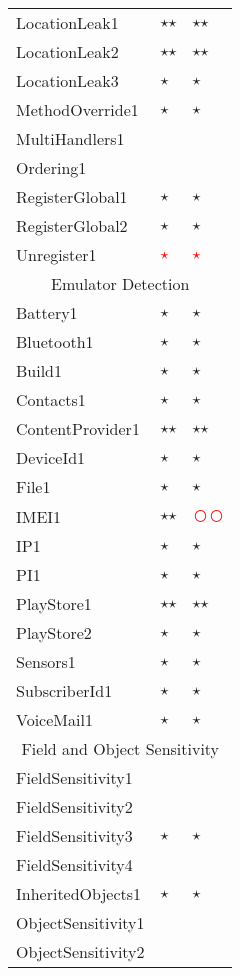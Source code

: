 \documentclass[../draft.tex]{subfiles}
\newcommand{\fp}{\textcolor{white}{\textcircled{\textcolor{red}{$\star$}}}}
\newcommand{\fn}{\textcolor{red}{\textcircled{ }}}
\newcommand{\tp}[0]{\textcircled{$\star$}}
\newcommand{\tsub}[1]{\multicolumn{3}{c}{#1}\\\hline}
\begin{document}
\begin{longtable}{l | l | l}
        LocationLeak1 & \tp \tp & \tp \tp\\
        LocationLeak2 & \tp \tp & \tp \tp\\
        LocationLeak3 & \tp & \tp\\
        MethodOverride1 & \tp & \tp\\
        MultiHandlers1 & & \\
        Ordering1 & & \\
        RegisterGlobal1 & \tp & \tp\\
        RegisterGlobal2 & \tp & \tp\\
        Unregister1 & \fp & \fp\\
        \hline
        \tsub{Emulator Detection}
        Battery1 & \tp & \tp\\
        Bluetooth1 & \tp & \tp\\
        Build1 & \tp & \tp\\
        Contacts1 & \tp & \tp\\
        ContentProvider1 & \tp \tp & \tp \tp\\
        DeviceId1 & \tp & \tp\\
        File1 & \tp & \tp\\
        IMEI1 & \tp \tp & \fn \fn\\
        IP1 & \tp & \tp\\
        PI1 & \tp & \tp\\
        PlayStore1 & \tp \tp & \tp \tp\\
        PlayStore2 & \tp & \tp\\
        Sensors1 & \tp & \tp\\
        SubscriberId1 & \tp & \tp\\
        VoiceMail1 & \tp & \tp\\
        \hline
        \tsub{Field and Object Sensitivity}
        FieldSensitivity1 & & \\
        FieldSensitivity2 & & \\
        FieldSensitivity3 & \tp & \tp\\
        FieldSensitivity4 & & \\
        InheritedObjects1 & \tp & \tp\\
        ObjectSensitivity1 & & \\
        ObjectSensitivity2 & & \\
        \hline

\end{longtable}
\end{document}
